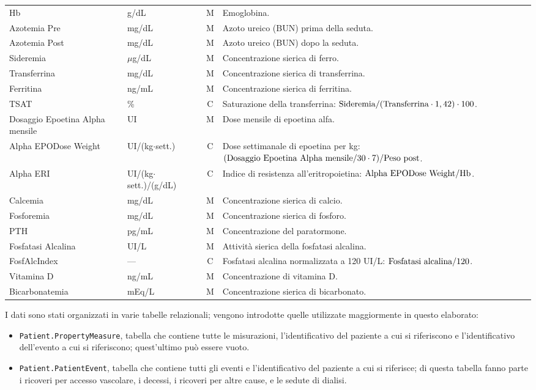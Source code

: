\documentclass[a4paper,12pt]{report}
\begin{document}
\begin{longtable}{@{}>{\raggedright\arraybackslash}p{3.1cm}
                   >{\raggedright\arraybackslash}p{2.4cm}
                   c
                   >{\raggedright\arraybackslash}p{7.0cm}@{}}
\multicolumn{4}{@{}l}{\textbf{Valori di laboratorio e terapia}} \\
\midrule
Hb & g/dL & M & Emoglobina. \\
Azotemia Pre & mg/dL & M & Azoto ureico (BUN) prima della seduta. \\
Azotemia Post & mg/dL & M & Azoto ureico (BUN) dopo la seduta. \\
Sideremia & $\mu$g/dL & M & Concentrazione sierica di ferro. \\
Transferrina & mg/dL & M & Concentrazione sierica di transferrina. \\
Ferritina & ng/mL & M & Concentrazione sierica di ferritina. \\
TSAT & \% & C & Saturazione della transferrina: $\text{Sideremia}/(\text{Transferrina}\cdot 1,42)\cdot 100$. \\
Dosaggio Epoetina Alpha mensile & UI & M & Dose mensile di epoetina alfa. \\
Alpha EPODose Weight & UI/(kg$\cdot$sett.) & C & Dose settimanale di epoetina per kg: $(\text{Dosaggio Epoetina Alpha mensile}/30\cdot 7)/\text{Peso post}$. \\
Alpha ERI & UI\slash(kg$\cdot$sett.)\slash(g/dL) & C & Indice di resistenza all'eritropoietina: $\text{Alpha EPODose Weight}/\text{Hb}$. \\
Calcemia & mg/dL & M & Concentrazione sierica di calcio. \\
Fosforemia & mg/dL & M & Concentrazione sierica di fosforo. \\
PTH & pg/mL & M & Concentrazione del paratormone. \\
Fosfatasi Alcalina & UI/L & M & Attività sierica della fosfatasi alcalina. \\
FosfAlcIndex & --- & C & Fosfatasi alcalina normalizzata a 120 UI/L: $\text{Fosfatasi alcalina}/120$. \\
Vitamina D & ng/mL & M & Concentrazione di vitamina D. \\
Bicarbonatemia & mEq/L & M & Concentrazione sierica di bicarbonato. \\
\end{longtable}
\normalsize

I dati sono stati organizzati in varie tabelle relazionali; vengono introdotte quelle utilizzate maggiormente in questo elaborato: 
\begin{itemize}
    \item \texttt{Patient.PropertyMeasure}, tabella che contiene tutte le misurazioni, l'identificativo del paziente a cui si riferiscono e l'identificativo dell'evento a cui si riferiscono; quest'ultimo può essere vuoto.
    \item \texttt{Patient.PatientEvent}, tabella che contiene tutti gli eventi e l'identificativo del paziente a cui si riferisce; di questa tabella fanno parte i ricoveri per accesso vascolare, i decessi, i ricoveri per altre cause, e le sedute di dialisi.
\end{itemize}
\end{document}
